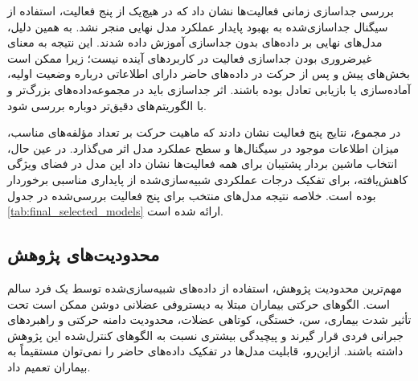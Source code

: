 بررسی جداسازی زمانی فعالیت‌ها نشان داد که در هیچ‌یک از پنج فعالیت، استفاده از سیگنال جداسازی‌شده به بهبود پایدار عملکرد مدل نهایی منجر نشد. به همین دلیل، مدل‌های نهایی بر داده‌های بدون جداسازی آموزش داده شدند. این نتیجه به معنای غیرضروری بودن جداسازی فعالیت در کاربردهای آینده نیست؛ زیرا ممکن است بخش‌های پیش و پس از حرکت در داده‌های حاضر دارای اطلاعاتی درباره وضعیت اولیه، آماده‌سازی یا بازیابی تعادل بوده باشند. اثر جداسازی باید در مجموعه‌داده‌های بزرگ‌تر و با الگوریتم‌های دقیق‌تر دوباره بررسی شود.

در مجموع، نتایج پنج فعالیت نشان دادند که ماهیت حرکت بر تعداد مؤلفه‌های مناسب، میزان اطلاعات موجود در سیگنال‌ها و سطح عملکرد مدل اثر می‌گذارد. در عین حال، انتخاب ماشین بردار پشتیبان برای همه فعالیت‌ها نشان داد این مدل در فضای ویژگی کاهش‌یافته، برای تفکیک درجات عملکردی شبیه‌سازی‌شده از پایداری مناسبی برخوردار بوده است. خلاصه نتیجه مدل‌های منتخب برای پنج فعالیت بررسی‌شده در جدول \ref{tab:final_selected_models} ارائه شده است.

\begin{table}[H]
	\centering
	\caption{نتیجه مدل منتخب برای فعالیت‌های مختلف}
	\label{tab:final_selected_models}
\end{table}

\subsection{محدودیت‌های پژوهش}

مهم‌ترین محدودیت پژوهش، استفاده از داده‌های شبیه‌سازی‌شده توسط یک فرد سالم است. الگوهای حرکتی بیماران مبتلا به دیستروفی عضلانی دوشن ممکن است تحت تأثیر شدت بیماری، سن، خستگی، کوتاهی عضلات، محدودیت دامنه حرکتی و راهبردهای جبرانی فردی قرار گیرند و پیچیدگی بیشتری نسبت به الگوهای کنترل‌شده این پژوهش داشته باشند. ازاین‌رو، قابلیت مدل‌ها در تفکیک داده‌های حاضر را نمی‌توان مستقیماً به بیماران تعمیم داد.

